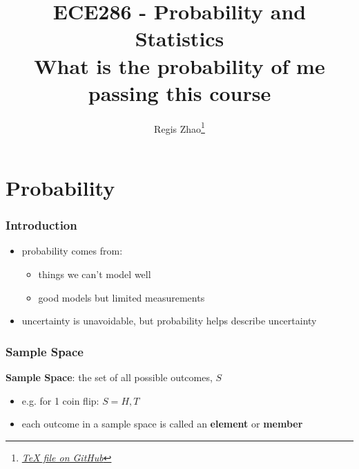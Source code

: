 \documentclass[10pt]{article}
\title{{\Huge ECE286 - Probability and Statistics}\\{\Large{What is the probability of me passing this course}}}
\author{Regis Zhao\footnote{\href{https://google.com/}{\textit{TeX file on GitHub}}}}
\affiliation{University of Toronto}
\begin{document}
\maketitle
\flushbottom
\newpage

\pagestyle{fancynotes}

\part{Probability}

\section{Introduction}
\begin{itemize}
    \item probability comes from:
        \begin{itemize}
            \item things we can't model well
            \item good models but limited measurements
        \end{itemize}
    \item uncertainty is unavoidable, but probability helps describe uncertainty
\end{itemize}

\section{Sample Space}
\begin{definition}
    \textbf{Sample Space}: the set of all possible outcomes, $S$ 
    \begin{itemize}
        \item e.g. for 1 coin flip: $S = {H, T}$
    \end{itemize}
\end{definition}
\begin{itemize}
    \item each outcome in a sample space is called an \textbf{element} or \textbf{member}
\end{itemize}
\end{document}
